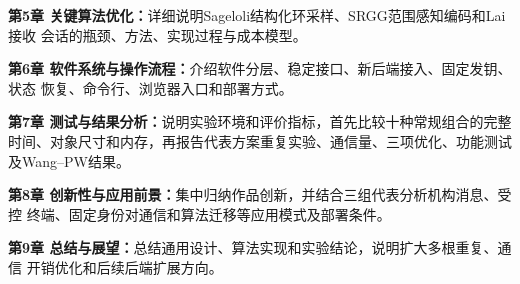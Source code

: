 \noindent\textbf{第5章 关键算法优化：}详细说明Sageloli结构化环采样、SRGG范围感知编码和Lai接收
会话的瓶颈、方法、实现过程与成本模型。

\noindent\textbf{第6章 软件系统与操作流程：}介绍软件分层、稳定接口、新后端接入、固定发钥、状态
恢复、命令行、浏览器入口和部署方式。

\noindent\textbf{第7章 测试与结果分析：}说明实验环境和评价指标，首先比较十种常规组合的完整
时间、对象尺寸和内存，再报告代表方案重复实验、通信量、三项优化、功能测试及Wang--PW结果。

\noindent\textbf{第8章 创新性与应用前景：}集中归纳作品创新，并结合三组代表分析机构消息、受控
终端、固定身份对通信和算法迁移等应用模式及部署条件。

\noindent\textbf{第9章 总结与展望：}总结通用设计、算法实现和实验结论，说明扩大多根重复、通信
开销优化和后续后端扩展方向。
